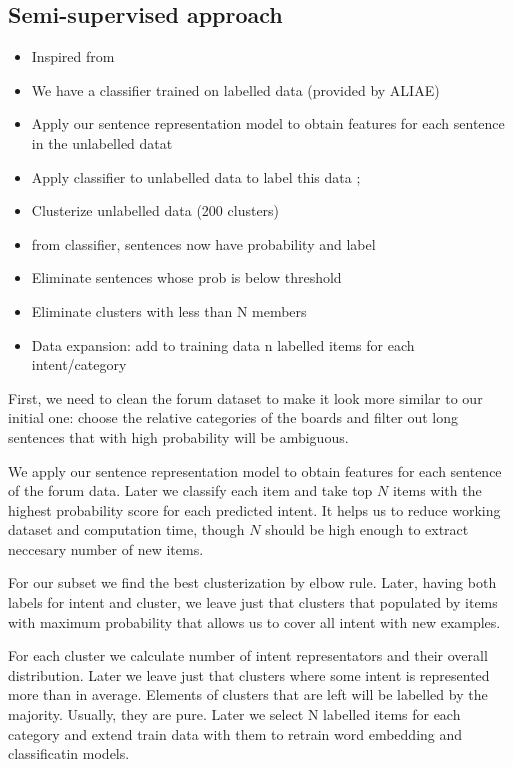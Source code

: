 \documentclass[11pt]{article}
\begin{document}
\subsection{Semi-supervised approach}
\label{subsec:dataexpansion}

\begin{itemize}
\item Inspired from \cite{N18-2058}
\item We have a classifier trained on labelled data (provided by ALIAE)
\item Apply our sentence representation model to obtain features for each sentence in the unlabelled datat
\item Apply classifier to unlabelled data to label this data ; 
\item Clusterize unlabelled data (200 clusters)
\item from classifier, sentences now have probability and label
\item Eliminate sentences whose prob is below threshold
\item Eliminate clusters with less than N members
\item Data expansion: add to training data n labelled items for each intent/category
\end{itemize}

First, we need to clean the forum dataset to make it look more similar to our initial one: choose the relative categories of the boards and filter out long sentences that with high probability will be ambiguous.

We apply our sentence representation model to obtain features for each sentence of the forum data. Later we classify each item and take top $N$ items with the highest probability score for each predicted intent. It helps us to reduce working dataset and computation time, though $N$ should be high enough to extract neccesary number of new items.

For our subset we find the best clusterization by elbow rule. Later, having both labels for intent and cluster, we leave just that clusters that populated by items with maximum probability that allows us to cover all intent with new examples.

For each cluster we calculate number of intent representators and their overall distribution. Later we leave just that clusters where some intent is represented more than in average. Elements of clusters that are left will be labelled by the majority. Usually, they are pure. Later we select N labelled items for each category and extend train data with them to retrain word embedding and classificatin models.
\end{document}
